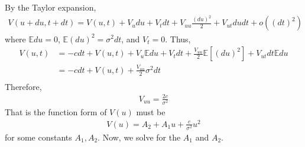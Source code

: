 \documentclass[11pt]{elegantbook}
\begin{document}
By the Taylor expansion,
\begin{equation}
    \begin{aligned}
        V(u+du,t+dt)=V(u,t)+V_u du+V_t dt+V_{uu}\frac{(du)^2}{2}+V_{ut}dudt+o((dt)^2)
    \end{aligned}
    \nonumber
\end{equation}
where $\mathbb{E}du=0$, $\mathbb{E}(du)^2=\sigma^2dt$, and $V_t=0$. Thus,
\begin{equation}
    \begin{aligned}
        V(u,t)&=-cdt+V(u,t)+V_u\mathbb{E}du+V_t dt+\frac{V_{uu}}{2}\mathbb{E}[(du)^2]+V_{ut}dt\mathbb{E}du\\
        &=-cdt+V(u,t)+\frac{V_{uu}}{2}\sigma^2 dt\\
    \end{aligned}
    \nonumber
\end{equation}
Therefore,
\begin{equation}
    \begin{aligned}
        V_{uu}=\frac{2c}{\sigma^2}
    \end{aligned}
    \nonumber
\end{equation}
That is the function form of $V(u)$ must be
\begin{equation}
    \begin{aligned}
        V(u)=A_2+A_1 u +\frac{c}{\sigma^2}u^2
    \end{aligned}
    \nonumber
\end{equation}
for some constants $A_1,A_2$. Now, we solve for the $A_1$ and $A_2$.
\end{document}
